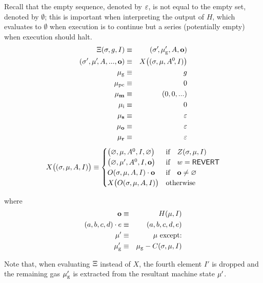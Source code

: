 Recall that the empty sequence, denoted by $\mathbb{\varepsilon}$, is not equal to the empty set, denoted by $\emptyset$; this is important when interpreting the output of $H$, which evaluates to $\emptyset$ when execution is to continue but a series (potentially empty) when execution should halt.
\begin{eqnarray}
\mathrm{\Xi}(\mathbf{\sigma}, g, I) & \equiv & (\mathbf{\sigma}'\!, \mathbf{\mu}'_{\mathrm{g}}, A, \mathbf{o}) \\
(\mathbf{\sigma}', \mathbf{\mu}'\!, A, ..., \mathbf{o}) & \equiv & X\big((\mathbf{\sigma}, \mathbf{\mu}, A^0\!, I)\big) \\
\mathbf{\mu}_{\mathrm{g}} & \equiv & g \\
\mathbf{\mu}_{\mathrm{pc}} & \equiv & 0 \\
\mathbf{\mu}_{\mathbf{m}} & \equiv & (0, 0, ...) \\
\mathbf{\mu}_{\mathrm{i}} & \equiv & 0	\\
\mathbf{\mu}_{\mathbf{s}} & \equiv & \mathbb{\varepsilon} \\
\mathbf{\mu}_{\mathbf{o}} & \equiv & \mathbb{\varepsilon}	\\
\mathbf{\mu}_{\mathbf{r}} & \equiv & \mathbb{\varepsilon}
\end{eqnarray}
\begin{equation} \label{eq:X-def}
X\big( (\mathbf{\sigma}, \mathbf{\mu}, A, I) \big) \equiv \begin{cases}
\big(\varnothing, \mathbf{\mu}, A^0, I, \varnothing\big) & \text{if} \quad Z(\mathbf{\sigma}, \mathbf{\mu}, I) \\
\big(\varnothing, \mathbf{\mu}', A^0, I, \mathbf{o}\big) & \text{if} \quad w =  \mathsf{REVERT} \\
O(\mathbf{\sigma}, \mathbf{\mu}, A, I) \cdot \mathbf{o} & \text{if} \quad \mathbf{o} \neq \varnothing \\
X\big(O(\mathbf{\sigma}, \mathbf{\mu}, A, I)\big) & \text{otherwise} \\
\end{cases}
\end{equation}

where
\begin{eqnarray}
\mathbf{o} & \equiv & H(\mathbf{\mu}, I) \\
(a, b, c, d) \cdot e & \equiv & (a, b, c, d, e) \\
\mathbf{\mu}' & \equiv & \mathbf{\mu}\ \text{except:} \\
\mathbf{\mu}'_{\mathrm{g}} & \equiv & \mathbf{\mu}_{\mathrm{g}} - C(\mathbf{\sigma}, \mathbf{\mu}, I)
\end{eqnarray}

Note that, when evaluating $\mathrm{\Xi}$ instead of $X$, 
the fourth element $I'$ is dropped and the remaining gas $\mathbf{\mu}'_{\mathrm{g}}$ is extracted from the resultant machine state $\mathbf{\mu}'$.

